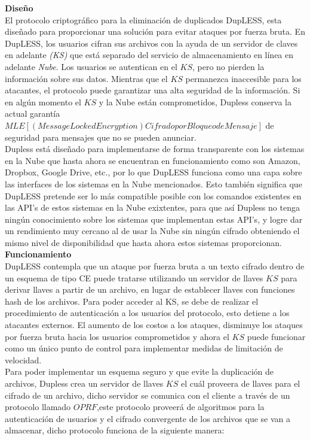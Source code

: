 \textbf{Diseño} \\

El protocolo criptográfico para la eliminación de duplicados DupLESS, esta diseñado para proporcionar una solución para evitar ataques por fuerza bruta. En DupLESS, los usuarios cifran sus archivos con la ayuda de un servidor de claves en adelante \textit{(KS)} que está separado del servicio de almacenamiento en línea en adelante \textit{Nube}. Los usuarios se autentican en el $KS$, pero no pierden la información sobre sus datos. Mientras que el $KS$ permanezca inaccesible para los atacantes, el protocolo puede garantizar una alta seguridad de la información. Si en algún momento el $KS$ y la Nube están comprometidos, Dupless conserva la actual garantía $MLE[(Message Locked Encryption) Cifrado por Bloqueo de Mensaje]$ de seguridad para mensajes que no se pueden anunciar.\\ 

Dupless está diseñado para implementarse de forma transparente con los sistemas en la Nube que hasta ahora se encuentran en funcionamiento como son Amazon, Dropbox, Google Drive, etc., por lo que DupLESS funciona como una capa sobre las interfaces de los sistemas en la Nube mencionados. Esto también significa que DupLESS pretende ser lo más compatible posible con los comandos existentes en las API's de estos sistemas en la Nube exixtentes, para que así Dupless no tenga ningún conocimiento sobre los sistemas que implementan estas API's, y logre dar un rendimiento muy cercano al de usar la Nube sin ningún cifrado obteniendo el mismo nivel de disponibilidad que hasta ahora estos sistemas proporcionan.  \\


\textbf{Funcionamiento}\\

DupLESS contempla que un ataque por fuerza bruta a un texto cifrado dentro de un esquema de tipo CE puede tratarse utilizando un servidor de llaves $KS$ para derivar llaves a partir de un archivo, en lugar de establecer llaves con funciones hash de los archivos. Para poder acceder al KS, se debe de realizar el procedimiento de autenticación a los usuarios del protocolo, esto detiene a los atacantes externos. El aumento de los costos a los ataques, disminuye los ataques por fuerza bruta hacia los usuarios comprometidos y ahora el $KS$ puede funcionar como un único punto de control para implementar medidas de limitación de velocidad. \\

Para poder implementar un esquema seguro y que evite la duplicación de archivos, Dupless crea un servidor de llaves $KS$ el cuál proveera de llaves para el cifrado de un archivo, dicho servidor se comunica con el cliente a través de un protocolo llamado $OPRF$,este protocolo proveerá de algoritmos para la autenticación de usuarios y el cifrado convergente de los archivos que se van a almacenar, dicho protocolo funciona de la siguiente manera: \\ 

